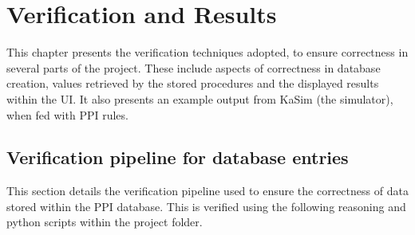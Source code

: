 \documentclass[msc,deptreport,ai]{infthesis}      %
\begin{document}
\chapter{Verification and Results}
This chapter presents the verification techniques adopted, to ensure correctness in several parts of the project. These include aspects of correctness in database creation, values retrieved by the stored procedures and the displayed results within the UI. It also presents an example output from KaSim (the simulator), when fed with PPI rules.
\section{Verification pipeline for database entries}
This section details the verification pipeline used to ensure the correctness of data stored within the PPI database. This is verified using the following reasoning and python scripts within the project folder.
\end{document}
